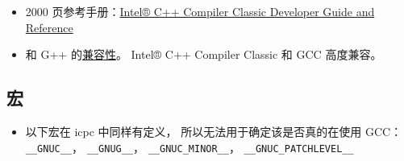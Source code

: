 
\begin{issues}
\issueDraft
\end{issues}

\begin{itemize}
\item 2000 页参考手册：\href{https://www.intel.com/content/www/us/en/develop/documentation/cpp-compiler-developer-guide-and-reference/top.html}{Intel® C++ Compiler Classic Developer Guide and Reference}
\item 和 G++ 的\href{https://www.intel.com/content/www/us/en/develop/documentation/cpp-compiler-developer-guide-and-reference/top/compatibility-and-portability/gcc-compatibility-and-interoperability.html}{兼容性}。 Intel® C++ Compiler Classic 和 GCC 高度兼容。
\end{itemize}

\subsection{宏}
\begin{itemize}
\item 以下宏在 icpc 中同样有定义， 所以无法用于确定该是否真的在使用 GCC： \verb`__GNUC__`， \verb`__GNUG__`， \verb`__GNUC_MINOR__`， \verb`__GNUC_PATCHLEVEL__`
\end{itemize}

